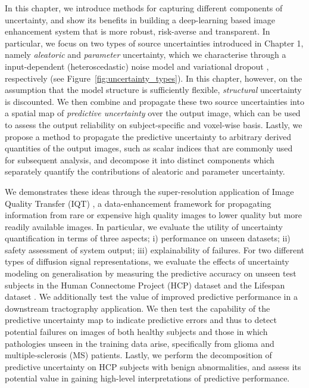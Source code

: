 In this chapter, we introduce methods for capturing different components of uncertainty, and show its benefits in building a deep-learning based image enhancement system that is more robust, risk-averse and transparent. In particular, we focus on two types of source uncertainties introduced in Chapter 1, namely \textit{aleatoric} and \textit{parameter} uncertainty, which we characterise through a input-dependent (heteroscedastic) noise model \cite{nix1994estimating} and variational dropout \cite{kingma2015variational}, respectively (see Figure~\ref{fig:uncertainty_types}). In this chapter, however, on the assumption that the model structure is sufficiently flexible, \textit{structural} uncertainty is discounted. We then combine and propagate these two source uncertainties into a spatial map of \textit{predictive uncertainty} over the output image, which can be used to assess the output reliability on subject-specific and voxel-wise basis. Lastly, we propose a method to propagate the predictive uncertainty to arbitrary derived quantities of the output images, such as scalar indices that are commonly used for subsequent analysis, and decompose it into distinct components which separately quantify the contributions of aleatoric and parameter uncertainty. 

We demonstrates these ideas through the super-resolution application of Image Quality Transfer (IQT) \cite{alexander2014image,tanno2016bayesian,alexander2017image,blumberg2018deeper}, a data-enhancement framework for propagating information from rare or expensive high quality images to lower quality but more readily available images. In particular, we evaluate the utility of uncertainty quantification in terms of three aspects; i) performance on unseen datasets; ii) safety assessment of system output; iii) explainability of failures. For two different types of diffusion signal representations, we evaluate the effects of uncertainty modeling on generalisation by measuring the predictive accuracy on unseen test subjects in the Human Connectome Project (HCP) dataset \cite{sotiropoulos2013advances} and the Lifespan dataset \cite{harms2018extending}. We additionally test the value of improved predictive performance in a downstream tractography application. We then test the capability of the predictive uncertainty map to indicate predictive errors and thus to detect potential failures on images of both healthy subjects and those in which pathologies unseen in the training data arise, specifically from glioma and multiple-sclerosis (MS) patients. Lastly, we perform the decomposition of predictive uncertainty on HCP subjects with benign abnormalities, and assess its potential value in gaining high-level interpretations of predictive performance. 



